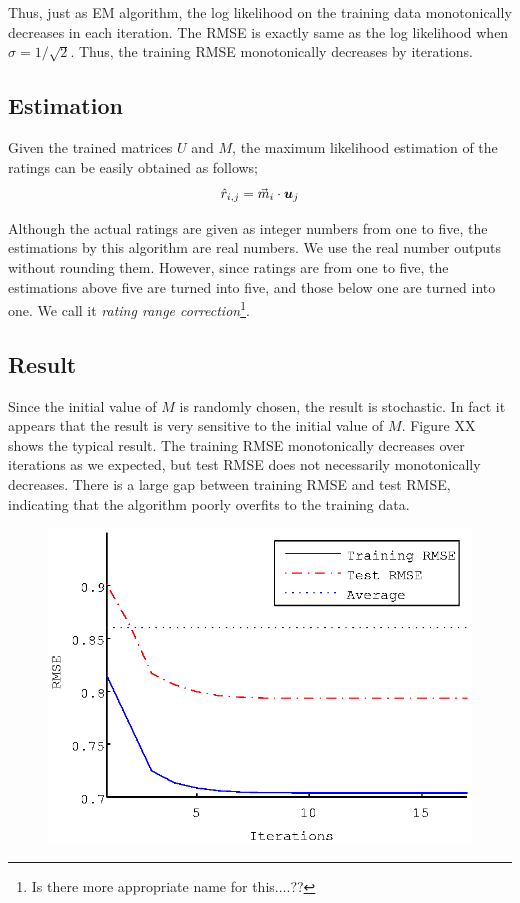 \documentclass{article}
\begin{document}
Thus, just as EM algorithm, the log likelihood on the training data monotonically decreases in each iteration. The RMSE is exactly same as the log likelihood when $\sigma = 1/\sqrt{2}$. Thus, the training RMSE monotonically decreases by iterations.

\subsection{Estimation}
Given the trained matrices $U$ and $M$, the maximum likelihood estimation of the ratings can be easily obtained as follows;
\begin{equation}
\hat{r}_{i,j}=\vec{m}_i \cdot {{ \mbox{\boldmath $u$} }}_j
\end{equation}

Although the actual ratings are given as integer numbers from one to five, the estimations by this algorithm are real numbers. We use the real number outputs without rounding them. However, since ratings are from one to five, the estimations above five are turned into five, and those below one are turned into one. We call it \textit{rating range correction}\footnote{Is there more appropriate name for this....??}.

\subsection{Result}

Since the initial value of $M$ is randomly chosen, the result is stochastic. In fact it appears that the result is very sensitive to the initial value of $M$. Figure XX shows the typical result. The training RMSE monotonically decreases over iterations as we expected, but test RMSE does not necessarily monotonically decreases. There is a large gap between training RMSE and test RMSE, indicating that the algorithm poorly overfits to the training data.

\begin{figure}[h]
  \begin{center}
    \includegraphics{figure/lrem_typical_plot.eps}
  \end{center}
  \caption{}
  \label{fig:lrem_typical_plot.eps}
\end{figure}
\end{document}
